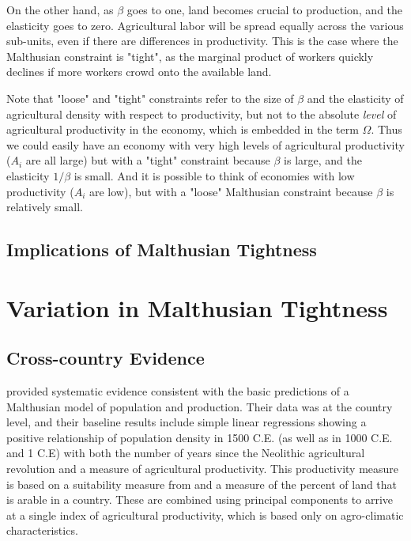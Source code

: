 \documentclass[10pt]{article}
\begin{document}
On the other hand, as $\beta$ goes to one, land becomes crucial to production, and the elasticity goes to zero. Agricultural labor will be spread equally across the various sub-units, even if there are differences in productivity. This is the case where the Malthusian constraint is "tight", as the marginal product of workers quickly declines if more workers crowd onto the available land. 

Note that "loose" and "tight" constraints refer to the size of $\beta$ and the elasticity of agricultural density with respect to productivity, but not to the absolute \textit{level} of agricultural productivity in the economy, which is embedded in the term $\Omega$. Thus we could easily have an economy with very high levels of agricultural productivity ($A_i$ are all large) but with a "tight" constraint because $\beta$ is large, and the elasticity $1/\beta$ is small. And it is possible to think of economies with low productivity ($A_i$ are low), but with a "loose" Malthusian constraint because $\beta$ is relatively small.

\subsection{Implications of Malthusian Tightness}

\section{Variation in Malthusian Tightness}

\subsection{Cross-country Evidence}
\citet{ashraf2010dynamics} provided systematic evidence consistent with the basic predictions of a Malthusian model of population and production. Their data was at the country level, and their baseline results include simple linear regressions showing a positive relationship of population density in 1500 C.E. (as well as in 1000 C.E. and 1 C.E) with both the number of years since the Neolithic agricultural revolution and a measure of agricultural productivity. This productivity measure is based on a suitability measure from \citet{ramankutty2002} and a measure of the percent of land that is arable in a country. These are combined using principal components to arrive at a single index of agricultural productivity, which is based only on agro-climatic characteristics.
\end{document}
